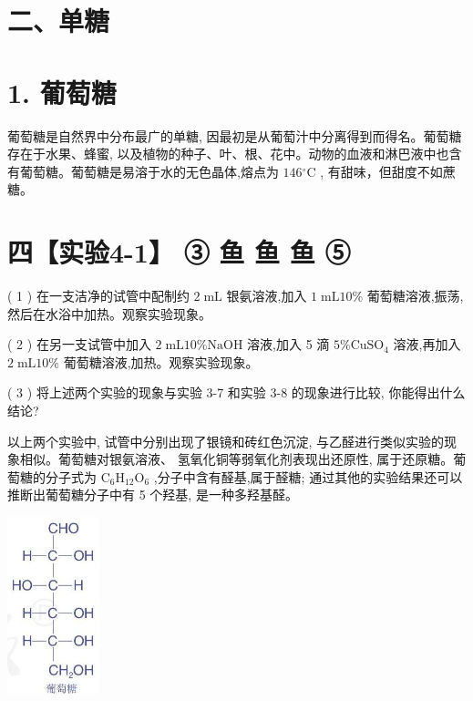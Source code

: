 \documentclass[10pt]{article}
\begin{document}
\section*{二、单糖}

\section*{1. 葡萄糖}

葡萄糖是自然界中分布最广的单糖, 因最初是从葡萄汁中分离得到而得名。葡萄糖存在于水果、蜂蜜, 以及植物的种子、叶、根、花中。动物的血液和淋巴液中也含有葡萄糖。葡萄糖是易溶于水的无色晶体,熔点为 \({146}{}^{ \circ }\mathrm{C}\) , 有甜味，但甜度不如蔗糖。

\section*{四【实验4-1】 ③ 鱼 鱼 鱼 ⑤}

( 1 ) 在一支洁净的试管中配制约 \(2\mathrm{\;{mL}}\) 银氨溶液,加入 \(1\mathrm{\;{mL}}{10}\%\) 葡萄糖溶液,振荡,然后在水浴中加热。观察实验现象。

( 2 ) 在另一支试管中加入 \(2\mathrm{\;{mL}}{10}\% \mathrm{{NaOH}}\) 溶液,加入 5 滴 \(5\% {\mathrm{{CuSO}}}_{4}\) 溶液,再加入 \(2\mathrm{\;{mL}}{10}\%\) 葡萄糖溶液,加热。观察实验现象。

( 3 ) 将上述两个实验的现象与实验 3-7 和实验 3-8 的现象进行比较, 你能得出什么结论?

以上两个实验中, 试管中分别出现了银镜和砖红色沉淀, 与乙醛进行类似实验的现象相似。葡萄糖对银氨溶液、 氢氧化铜等弱氧化剂表现出还原性, 属于还原糖。葡萄糖的分子式为 \({\mathrm{C}}_{6}{\mathrm{H}}_{12}{\mathrm{O}}_{6}\) ,分子中含有醛基,属于醛糖; 通过其他的实验结果还可以推断出葡萄糖分子中有 5 个羟基, 是一种多羟基醛。

\begin{center}
\includegraphics[max width=0.2\textwidth]{images/0190efc5-b58a-7c43-bfb0-e0a030df9cfd_108_679602.jpg}
\end{center}
\end{document}
